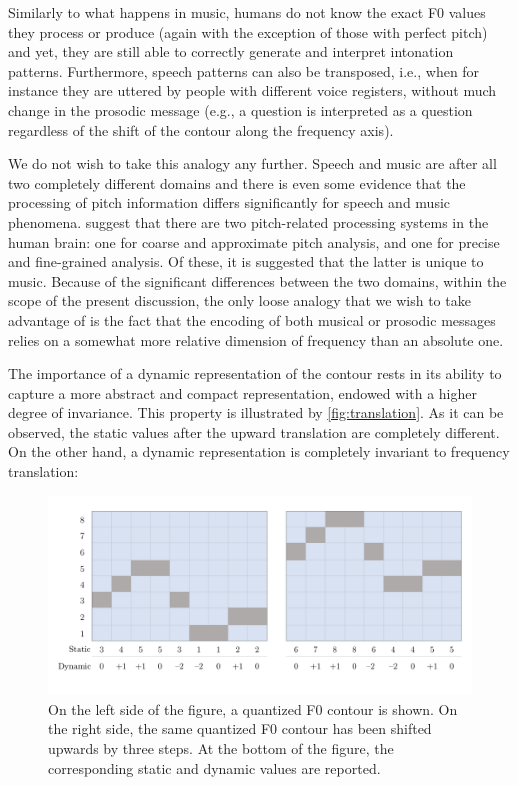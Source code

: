Similarly to what happens in music, humans do not know the exact \ac{F0} values they process or produce (again with the exception of those with perfect pitch) and yet, they are still able to correctly generate and interpret intonation patterns.
Furthermore, speech patterns can also be transposed, i.e., when for instance they are uttered by people with different voice registers, without much change in the prosodic message (e.g., a question is interpreted as a question regardless of the shift of the contour along the frequency axis).

We do not wish to take this analogy any further.
Speech and music are after all two completely different domains and there is even some evidence that the processing of pitch information differs significantly for speech and music phenomena.
\citet{Zatorre2012Musical} suggest that there are two pitch-related processing systems in the human brain: one for coarse and approximate pitch analysis, and one for precise and fine-grained analysis.
Of these, it is suggested that the latter is unique to music.
Because of the significant differences between the two domains, within the scope of the present discussion, the only loose analogy that we wish to take advantage of is the fact that the encoding of both musical or prosodic messages relies on a somewhat more relative dimension of frequency than an absolute one.

The importance of a dynamic representation of the contour rests in its ability to capture a more abstract and compact representation, endowed with a higher degree of invariance.
This property is illustrated by \autoref{fig:translation}.
As it can be observed, the static values after the upward translation are completely different.
On the other hand, a dynamic representation is completely invariant to frequency translation:

\begin{figure}[H]
    \centering
    \includegraphics[scale=0.38]{figures/translation.pdf}
    \caption[Contour translation]{On the left side of the figure, a quantized \ac{F0} contour is shown. On the right side, the same quantized \ac{F0} contour has been shifted upwards by three steps. At the bottom of the figure, the corresponding static and dynamic values are reported.}
    \label{fig:translation}
\end{figure}

